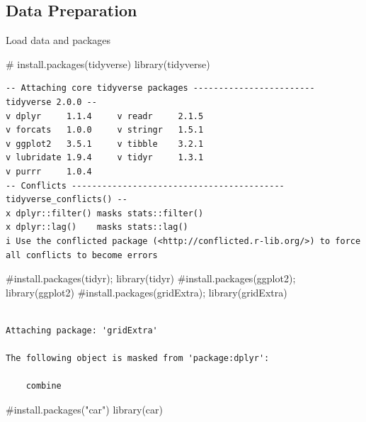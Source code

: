 \documentclass[
  letterpaper,
  DIV=11,
  numbers=noendperiod]{scrartcl}
\newenvironment{Shaded}{\begin{snugshade}}{\end{snugshade}}
\newcommand{\CommentTok}[1]{\textcolor[rgb]{0.37,0.37,0.37}{#1}}
\newcommand{\FunctionTok}[1]{\textcolor[rgb]{0.28,0.35,0.67}{#1}}
\newcommand{\NormalTok}[1]{\textcolor[rgb]{0.00,0.23,0.31}{#1}}
\begin{document}
\subsection{Data Preparation}\label{data-preparation}

Load data and packages

\begin{Shaded}
\begin{Highlighting}[]
\CommentTok{\# install.packages(\textquotesingle{}tidyverse\textquotesingle{})}
\FunctionTok{library}\NormalTok{(tidyverse)}
\end{Highlighting}
\end{Shaded}

\begin{verbatim}
-- Attaching core tidyverse packages ------------------------ tidyverse 2.0.0 --
v dplyr     1.1.4     v readr     2.1.5
v forcats   1.0.0     v stringr   1.5.1
v ggplot2   3.5.1     v tibble    3.2.1
v lubridate 1.9.4     v tidyr     1.3.1
v purrr     1.0.4     
-- Conflicts ------------------------------------------ tidyverse_conflicts() --
x dplyr::filter() masks stats::filter()
x dplyr::lag()    masks stats::lag()
i Use the conflicted package (<http://conflicted.r-lib.org/>) to force all conflicts to become errors
\end{verbatim}

\begin{Shaded}
\begin{Highlighting}[]
\CommentTok{\#install.packages(\textquotesingle{}tidyr\textquotesingle{}); }
\FunctionTok{library}\NormalTok{(tidyr)}
\CommentTok{\#install.packages(\textquotesingle{}ggplot2\textquotesingle{}); }
\FunctionTok{library}\NormalTok{(ggplot2)}
\CommentTok{\#install.packages(\textquotesingle{}gridExtra\textquotesingle{}); }
\FunctionTok{library}\NormalTok{(gridExtra)}
\end{Highlighting}
\end{Shaded}

\begin{verbatim}

Attaching package: 'gridExtra'

The following object is masked from 'package:dplyr':

    combine
\end{verbatim}

\begin{Shaded}
\begin{Highlighting}[]
\CommentTok{\#install.packages("car")}
\FunctionTok{library}\NormalTok{(car)}
\end{Highlighting}
\end{Shaded}
\end{document}
